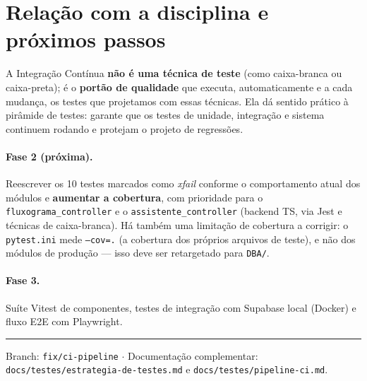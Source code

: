 \documentclass[11pt,a4paper]{article}
\begin{document}
\section{Relação com a disciplina e próximos passos}

A Integração Contínua \textbf{não é uma técnica de teste} (como caixa-branca ou
caixa-preta); é o \textbf{portão de qualidade} que executa, automaticamente e a
cada mudança, os testes que projetamos com essas técnicas. Ela dá sentido
prático à pirâmide de testes: garante que os testes de unidade, integração e
sistema continuem rodando e protejam o projeto de regressões.

\paragraph{Fase 2 (próxima).} Reescrever os 10 testes marcados como
\emph{xfail} conforme o comportamento atual dos módulos e \textbf{aumentar a
cobertura}, com prioridade para o \texttt{fluxograma\_controller} e o
\texttt{assistente\_controller} (backend TS, via Jest e técnicas de
caixa-branca). Há também uma limitação de cobertura a corrigir: o
\texttt{pytest.ini} mede \texttt{--cov=.} (a cobertura dos próprios arquivos de
teste), e não dos módulos de produção --- isso deve ser retargetado para
\texttt{DBA/}.

\paragraph{Fase 3.} Suíte Vitest de componentes, testes de integração com
Supabase local (Docker) e fluxo E2E com Playwright.

\bigskip
\hrule
\bigskip
\noindent\small
Branch: \texttt{fix/ci-pipeline} \quad$\cdot$\quad
Documentação complementar: \texttt{docs/testes/estrategia-de-testes.md} e
\texttt{docs/testes/pipeline-ci.md}.
\end{document}
